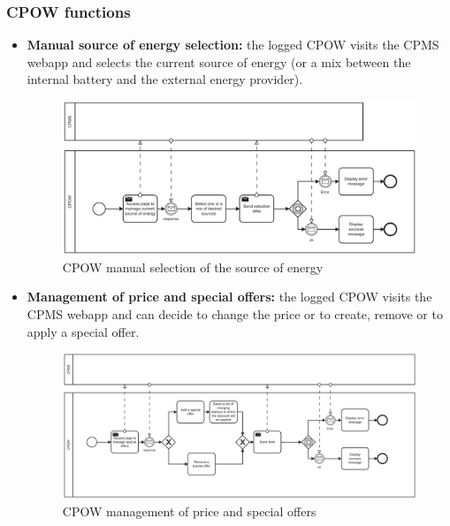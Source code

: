 \documentclass[table, 12pt]{article} %
\begin{document}
    \newpage
        \subsubsection{CPOW functions}
        \begin{itemize}                                 
            \item \textbf{Manual source of energy selection:} the logged CPOW visits the CPMS webapp and selects the current source of energy (or a mix between the internal battery and the external energy provider).
        
            \begin{center}
                \begin{figure}[!h]
                    \includegraphics[width=\textwidth]{assets/bpmn/CPOW_sel_source.png}
                    \caption{CPOW manual selection of the source of energy}
                    \label{fig: CPOW manual selection of the source of energy}
                \end{figure}
            \end{center}
        \end{itemize}
    \newpage
        \begin{itemize}                                 
            \item \textbf{Management of price and special offers:} the logged CPOW visits the CPMS webapp and can decide to change the price or to create, remove or to apply a special offer.
        
            \begin{center}
                \begin{figure}[!h]
                    \includegraphics[width=\textwidth]{assets/bpmn/CPOW_sel_offer.png}
                    \caption{CPOW management of price and special offers}
                    \label{fig: CPOW management of price and special offers}
                \end{figure}
            \end{center}
        \end{itemize}
    
\end{document}
